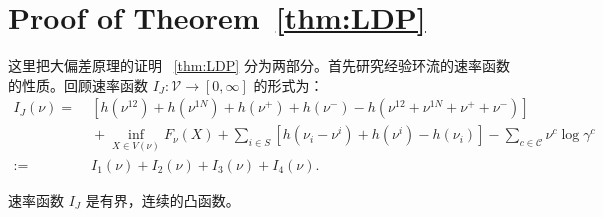 \section{Proof of Theorem~\ref{thm:LDP}}\label{appendix:LDP}
这里把大偏差原理的证明 ~\ref{thm:LDP} 分为两部分。首先研究经验环流的速率函数的性质。回顾速率函数 $I_J:\mathcal{V}\to[0,\infty]$ 的形式为：
\begin{equation*}\label{ratefunction1}
	\begin{split}
		I_J(\nu) =&\; \left[h\left(\nu^{12}\right)+h\left(\nu^{1N}\right)
		+h\left(\nu^+\right)+h\left(\nu^-\right)-h\left(\nu^{12}+\nu^{1N}+\nu^++\nu^-\right)\right] \\
		&\;+\inf_{X\in V(\nu)}F_{\nu}(X)+\sum_{i\in S}\left[ h\left(\nu_i-\nu^i\right)+h\left(\nu^i\right)
		-h\left(\nu_i\right)\right]-\sum_{c\in\mathcal{C}}\nu^c\log\gamma^c\\
		:=&\;I_1(\nu)+I_2(\nu)+I_3(\nu)+I_4(\nu).
	\end{split}
\end{equation*}
\begin{proposition}\label{proposition:I}
	速率函数 $I_J$ 是有界，连续的凸函数。
\end{proposition}
